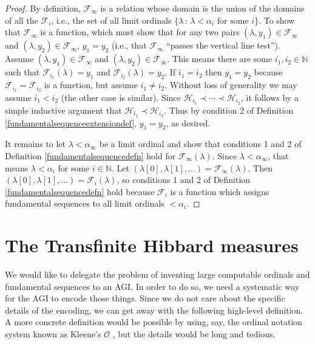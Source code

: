 \documentclass{article}
\begin{document}
\begin{proof}
    By definition, $\mathcal F_\infty$ is a relation whose domain is
    the union of the domains of all the $\mathcal F_i$, i.e.,
    the set of all limit ordinals $\{\lambda\,:\,\lambda<\alpha_i\mbox{ for some $i$}\}$.
    To show that $\mathcal F_\infty$ is a function, which must show that for any two pairs
    $(\lambda,y_1)\in\mathcal F_\infty$ and $(\lambda,y_2)\in\mathcal F_\infty$,
    $y_1=y_2$ (i.e., that
    $\mathcal F_\infty$ ``passes the vertical line test'').
    Assume $(\lambda,y_1)\in\mathcal F_\infty$ and $(\lambda,y_2)\in\mathcal F_\infty$.
    This means there are some $i_1,i_2\in\mathbb N$ such that
    $\mathcal F_{i_1}(\lambda)=y_1$ and $\mathcal F_{i_2}(\lambda)=y_2$.
    If $i_1=i_2$ then $y_1=y_2$ because $\mathcal F_{i_1}=\mathcal F_{i_2}$ is a function,
    but assume $i_1\neq i_2$. Without loss of generality we may
    assume $i_1<i_2$ (the other case is similar).
    Since $\mathcal H_{i_1}\prec \cdots \prec \mathcal H_{i_2}$,
    it follows by a simple inductive argument that $\mathcal H_{i_1}\prec \mathcal H_{i_2}$.
    Thus by condition 2 of Definition \ref{fundamentalsequenceextensiondef},
    $y_1=y_2$, as desired.

    It remains to let $\lambda<\alpha_\infty$ be a limit ordinal and show
    that conditions 1 and 2 of Definition \ref{fundamentalsequencedefn}
    hold for $\mathcal F_\infty(\lambda)$.
    Since $\lambda<\alpha_\infty$, that means $\lambda<\alpha_i$ for some $i\in\mathbb N$.
    Let $(\lambda[0],\lambda[1],\ldots)=\mathcal F_\infty(\lambda)$.
    Then $(\lambda[0],\lambda[1],\ldots)=\mathcal F_i(\lambda)$, so
    conditions 1 and 2 of Definition \ref{fundamentalsequencedefn} hold because
    $\mathcal F_i$ is a function which assigns fundamental sequences to all limit
    ordinals $<\alpha_i$.
\end{proof}

\section{The Transfinite Hibbard measures}
\label{transfinitehibbardsection}

We would like to delegate the problem of inventing large computable ordinals and
fundamental sequences to an AGI. In order to do so, we need a systematic
way for the AGI to encode those things. Since we do not care about the specific
details of the encoding, we can get away with the following high-level definition.
A more concrete definition would be possible by using, say, the ordinal notation
system known as Kleene's $\mathcal O$ \cite{kleene1938notation}, but the details
would be long and tedious.
\end{document}
